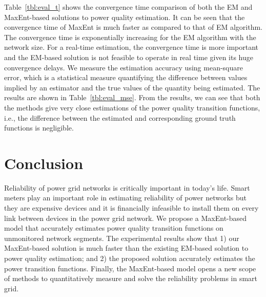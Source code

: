 Table~\ref{tbl:eval_t} shows the convergence time comparison of both the EM and MaxEnt-based solutions to power quality estimation. It can be seen that the convergence time of MaxEnt is much faster as compared to that of EM algorithm. The convergence time is exponentially increasing for the EM algorithm with the network size. For a real-time estimation, the convergence time is more important and the EM-based solution is not feasible to operate in real time given its huge convergence delays. We measure the estimation accuracy using mean-square error, which is a statistical measure quantifying the difference between values implied by an estimator and the true values of the quantity being estimated. The results are shown in Table~\ref{tbl:eval_mse}. From the results, we can see that both the methods give very close estimations of the power quality transition functions, i.e., the difference between the estimated and corresponding ground truth functions is negligible.


\section{Conclusion}
Reliability of power grid networks is critically important in today's life.  Smart meters play an important role in estimating reliability of power networks but they are expensive devices and it is financially infeasible to install them on every link between devices in the power grid network. We propose a MaxEnt-based model that accurately estimates power quality transition functions on unmonitored network segments. The experimental results show that 1) our MaxEnt-based solution is much faster than the existing EM-based solution to power quality estimation; and 2) the proposed solution accurately estimates the power transition functions. Finally, the MaxEnt-based model opens a new scope of methods to quantitatively measure and solve the reliability problems in smart grid.